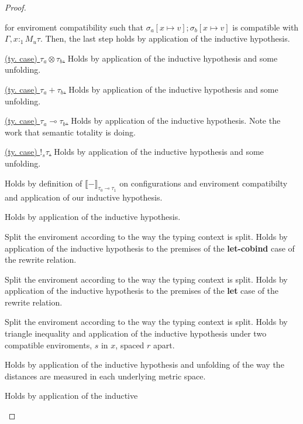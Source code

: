 \begin{proof}
\begin{description}
\begin{description}
        for enviroment compatibility such that $\sigma_a[x \mapsto v];
        \sigma_b[x \mapsto v]$ is compatible with $\Gamma, x :_1 M_u \tau$.
        Then, the last step holds by application of the inductive hypothesis.
      \item{\underline{(ty. case) $\tau_a \otimes \tau_b$.}} Holds by
        application of the inductive hypothesis and some unfolding.
      \item{\underline{(ty. case) $\tau_a + \tau_b$.}} Holds by application of
        the inductive hypothesis and some unfolding.
      \item{\underline{(ty. case) $\tau_a \multimap \tau_b$.}} Holds by
        application of the inductive hypothesis. Note the work that semantic
        totality is doing.
      \item{\underline{(ty. case) $!_s \tau$.}} Holds by application of the
        inductive hypothesis and some unfolding.
    \end{description}
  \item[\textsc{(ty. rule) $\multimap E$.}] Holds by definition of $\llbracket -
    \rrbracket_{\tau_0 \multimap \tau_1}$ on configurations and enviroment
    compatibilty and application of our inductive hypothesis.
  \item[\textsc{(ty. rule) $! I$.}] Holds by application of the inductive
    hypothesis.
  \item[\textsc{(ty. rule) $! E$.}] Split the enviroment according to the way
    the typing context is split. Holds by application of the inductive
    hypothesis to the premises of the \textbf{let-cobind} case of the rewrite
    relation.
  \item[\textsc{(ty. rule) Let.}] Split the enviroment according to the way the
    typing context is split. Holds by application of the inductive hypothesis to
    the premises of the \textbf{let} case of the rewrite relation.
  \item[\textsc{(ty. rule) $M_u \ E$.}] Split the enviroment according to the
    way the typing context is split. Holds by triangle inequality and
    application of the inductive hypothesis under two compatible enviroments,
    $s$ in $x$, spaced $r$ apart.
  \item[\textsc{(ty. rule) Factor.}] Holds by application of the inductive
    hypothesis and unfolding of the way the distances are measured in each
    underlying metric space.
  \item[\textsc{(ty. rule) $\times I$.}] Holds by application of the inductive

\end{description}
\end{proof}
